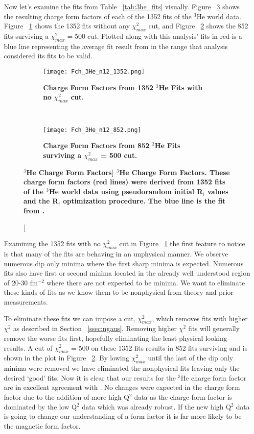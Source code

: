 Now let's examine the fits from Table ~\ref{tab:3he_fits} visually. Figure ~\ref{fig:3he_fch} shows the resulting charge form factors of each of the 1352 fits of the $^3$He world data. Figure ~\ref{fig:3he_fch_no_cut} shows the 1352 fits without any $\chi^2_{max}$ cut, and Figure ~\ref{fig:3he_fch_cut} shows the 852 fits surviving a $\chi^2_{max}$ = 500 cut. Plotted along with this analysis' fits in red is a blue line representing the average fit result from \cite{Article:Amroun} in the range that analysis considered its fits to be valid. 

\begin{figure}[!ht]
\begin{subfigure}{1.\textwidth}
  \centering
  \texttt{[image: Fch\_3He\_n12\_1352.png]}
  \caption{\bf{Charge Form Factors from 1352 $^3$He Fits with no $\chi^2_{max}$ cut.}}
  \label{fig:3he_fch_no_cut}
\end{subfigure}\\
\begin{subfigure}{1.\textwidth}
  \centering
  \texttt{[image: Fch\_3He\_n12\_852.png]}
  \caption{\bf{Charge Form Factors from 852 $^3$He Fits surviving a $\chi^2_{max}$ = 500 cut.}}
  \label{fig:3he_fch_cut}
\end{subfigure}
\caption[\bf{$^3$He Charge Form Factors}] {
{\bf{$^3$He Charge Form Factors.}} These charge form factors (red lines) were derived from 1352 fits of the $^3$He world data using pseudorandom initial R$_i$ values and the R$_i$ optimization procedure. The blue line is the fit from \cite{Article:Amroun}.}
\label{fig:3he_fch}
\end{figure}

Examining the 1352 fits with no $\chi^2_{max}$ cut in Figure ~\ref{fig:3he_fch_no_cut} the first feature to notice is that many of the fits are behaving in an unphysical manner. We observe numerous dip only minima where the first sharp minima is expected. Numerous fits also have first or second minima located in the already well understood region of 20-30 fm$^{-2}$ where there are not expected to be minima. We want to eliminate these kinds of fits as we know them to be nonphysical from theory and prior measurements. 

To eliminate these fits we can impose a cut, $\chi^2_{max}$, which removes fits with higher $\chi^2$ as described in Section ~\ref{ssec:ngaus}. Removing higher $\chi^2$ fits will generally remove the worse fits first, hopefully eliminating the least physical looking results. A cut of $\chi^2_{max}$ = 500 on these 1352 fits results in 852 fits surviving and is shown in the plot in Figure ~\ref{fig:3he_fch_cut}. By lowing $\chi^2_{max}$ until the last of the dip only minima were removed we have eliminated the nonphysical fits leaving only the desired `good' fits. Now it is clear that our results for the $^3$He charge form factor are in excellent agreement with \cite{Article:Amroun}. No changes were expected in the charge form factor due to the addition of more high Q$^2$ data as the charge form factor is dominated by the low Q$^2$ data which was already robust. If the new high Q$^2$ data is going to change our understanding of a form factor it is far more likely to be the magnetic form factor.

